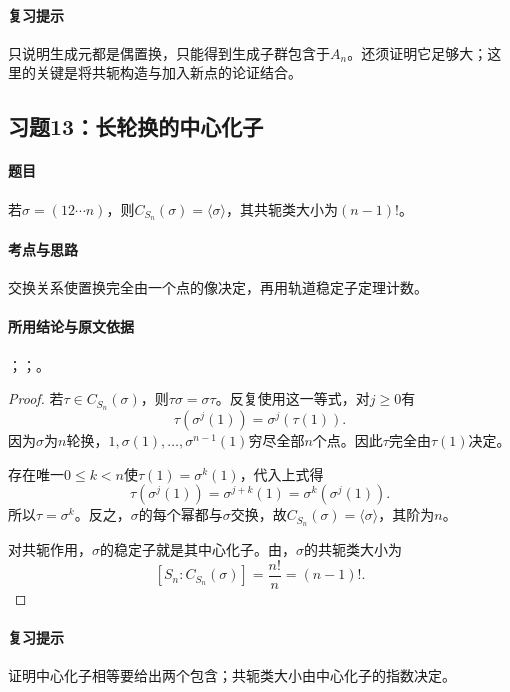 \paragraph{复习提示}
只说明生成元都是偶置换，只能得到生成子群包含于$A_n$。还须证明它足够大；这里的关键是将共轭构造与加入新点的论证结合。


\subsection{习题13：\texorpdfstring{长轮换的中心化子}{长轮换的中心化子}}
\label{ex:2:13}

\paragraph{题目}
若$\sigma=(12\cdots n)$，则$C_{S_n}(\sigma)=\langle\sigma\rangle$，其共轭类大小为$(n-1)!$。

\paragraph{考点与思路}
交换关系使置换完全由一个点的像决定，再用轨道稳定子定理计数。

\paragraph{所用结论与原文依据}
；；。


\begin{proof}
若$\tau\in C_{S_n}(\sigma)$，则$\tau\sigma=\sigma\tau$。反复使用这一等式，对$j\geq0$有
\[
\tau(\sigma^j(1))=\sigma^j(\tau(1)).
\]
因为$\sigma$为$n$轮换，$1,\sigma(1),\ldots,\sigma^{n-1}(1)$穷尽全部$n$个点。因此$\tau$完全由$\tau(1)$决定。

存在唯一$0\leq k<n$使$\tau(1)=\sigma^k(1)$，代入上式得
\[
\tau(\sigma^j(1))=\sigma^{j+k}(1)=\sigma^k(\sigma^j(1)).
\]
所以$\tau=\sigma^k$。反之，$\sigma$的每个幂都与$\sigma$交换，故$C_{S_n}(\sigma)=\langle\sigma\rangle$，其阶为$n$。

对共轭作用，$\sigma$的稳定子就是其中心化子。由，$\sigma$的共轭类大小为
\[
[S_n:C_{S_n}(\sigma)]=\frac{n!}{n}=(n-1)!.
\]
\end{proof}

\paragraph{复习提示}
证明中心化子相等要给出两个包含；共轭类大小由中心化子的指数决定。


